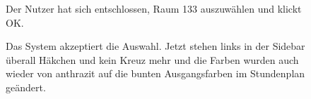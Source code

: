 \documentclass{swp1}
\begin{document}
\begin{figure}
\caption{Der Nutzer hat sich entschlossen, Raum 133 auszuwählen und klickt OK. }
\label{ab6}
\end{figure}

\begin{figure}
\caption{Das System akzeptiert die Auswahl. Jetzt stehen links in der Sidebar überall Häkchen und kein Kreuz mehr und die Farben wurden auch wieder von anthrazit auf die bunten Ausgangsfarben im Stundenplan geändert. }
\label{ab7}
\end{figure}
\end{document}
